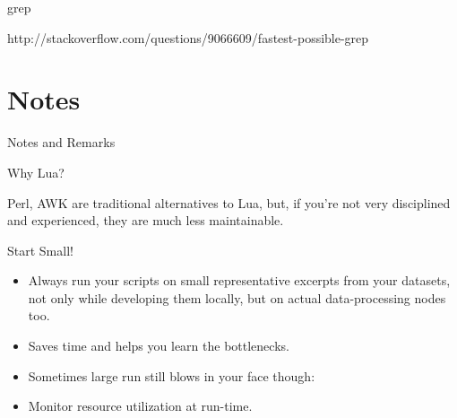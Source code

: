 \documentclass[handout]{beamer}
\begin{document}

\begin{frame}{grep}

http://stackoverflow.com/questions/9066609/fastest-possible-grep

\end{frame}


\section{Notes}


\begin{frame}
\huge Notes and Remarks
\end{frame}


\begin{frame}{Why Lua?}

Perl, AWK are traditional alternatives to Lua,
but, if you're not very disciplined and experienced,
they are much less maintainable.

\end{frame}


\begin{frame}{Start Small!}

\begin{itemize}
\item Always run your scripts on small representative excerpts
      from your datasets, not only while developing them locally,
      but on actual data-processing nodes too.
\item Saves time and helps you learn the bottlenecks.
\item Sometimes large run still blows in your face though:
\item Monitor resource utilization at run-time.
\end{itemize}

\end{frame}

\end{document}
